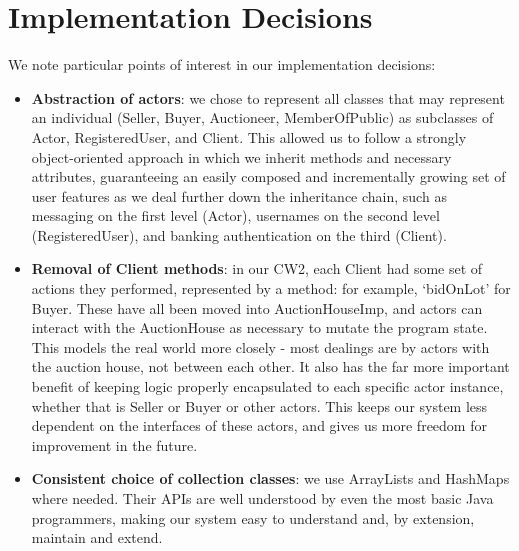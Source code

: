 \documentclass[titlepage, 12pt]{extarticle}
\begin{document}
\section{Implementation Decisions}
We note particular points of interest in our implementation decisions:
\begin{itemize}
    \item {\bf Abstraction of actors}: we chose to represent all classes that may represent an individual (Seller, Buyer, Auctioneer, MemberOfPublic) as subclasses of Actor, RegisteredUser, and Client. This allowed us to follow a strongly object-oriented approach in which we inherit methods and necessary attributes, guaranteeing an easily composed and incrementally growing set of user features as we deal further down the inheritance chain, such as messaging on the first level (Actor), usernames on the second level (RegisteredUser), and banking authentication on the third (Client).
    \item {\bf Removal of Client methods}: in our CW2, each Client had some set
        of actions they performed, represented by a method: for example,
        `bidOnLot' for Buyer. These have all been moved into AuctionHouseImp, and actors can interact with the AuctionHouse as necessary to mutate the program state. This models the real world more closely - most dealings are by actors with the auction house, not between each other. It also has the far more important benefit of keeping logic properly encapsulated to each specific actor instance, whether that is Seller or Buyer or other actors. This keeps our system less dependent on the interfaces of these actors, and gives us more freedom for improvement in the future.
    \item {\bf Consistent choice of collection classes}: we use ArrayLists and
        HashMaps where needed. Their APIs are well understood by even the most basic Java programmers, making our system easy to understand and, by extension, maintain and extend.
\end{itemize}


\end{document}
